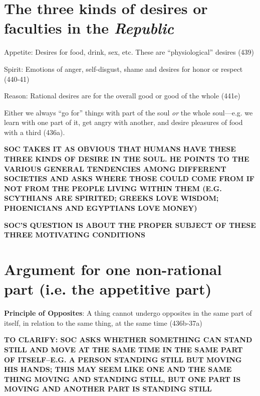\documentclass[11pt]{article}
\begin{document}
\section*{The three kinds of desires or faculties in the \emph{Republic}}

\noindent Appetite: Desires for food, drink, sex, etc. These are ``physiological'' desires (439)
\vspace*{.5mm}

\noindent Spirit: Emotions of anger, self-disgust, shame and desires for honor or respect (440-41)
\vspace*{.5mm}

\noindent Reason: Rational desires are for the overall good or good of the whole (441e)
\vspace*{2mm}

\noindent Either we always ``go for'' things with part of the soul \emph{or} the whole soul---e.g. we learn with one part of it, get angry with another, and desire pleasures of food with a third (436a).
\vspace*{2mm}

\noindent\textbf{SOC TAKES IT AS OBVIOUS THAT HUMANS HAVE THESE THREE KINDS OF DESIRE IN THE SOUL. HE POINTS TO THE VARIOUS GENERAL TENDENCIES AMONG DIFFERENT SOCIETIES AND ASKS WHERE THOSE COULD COME FROM IF NOT FROM THE PEOPLE LIVING WITHIN THEM (E.G. SCYTHIANS ARE SPIRITED; GREEKS LOVE WISDOM; PHOENICIANS AND EGYPTIANS LOVE MONEY)}
\vspace*{2mm}

\noindent\textbf{SOC'S QUESTION IS ABOUT THE PROPER SUBJECT OF THESE THREE MOTIVATING CONDITIONS}
\vspace*{-3mm}

\section*{Argument for one non-rational part (i.e. the appetitive part)}

\noindent [P1] \textbf{Principle of Opposites}: A thing cannot undergo opposites in the same part of itself, in relation to the same thing, at the same time (436b-37a)
\vspace*{1mm}

\noindent\textbf{TO CLARIFY: SOC ASKS WHETHER SOMETHING CAN STAND STILL AND MOVE AT THE SAME TIME IN THE SAME PART OF ITSELF--E.G. A PERSON STANDING STILL BUT MOVING HIS HANDS; THIS MAY SEEM LIKE ONE AND THE SAME THING MOVING AND STANDING STILL, BUT ONE PART IS MOVING AND ANOTHER PART IS STANDING STILL}
\vspace*{1mm}
\end{document}
